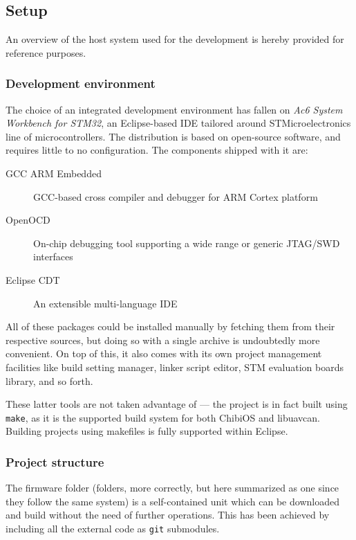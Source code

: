 \subsection{Setup}\label{subsec:sw_setup}
An overview of the host system used for the development is hereby provided for reference purposes.

\subsubsection{Development environment}
The choice of an integrated development environment has fallen on \emph{Ac6 System Workbench for STM32}, an Eclipse-based IDE tailored around STMicroelectronics line of microcontrollers.
The distribution is based on open-source software, and requires little to no configuration.
The components shipped with it are:
\begin{description}
    \item[GCC ARM Embedded] GCC-based cross compiler and debugger for ARM Cortex platform
    \item[OpenOCD] On-chip debugging tool supporting a wide range or generic JTAG/SWD interfaces
    \item[Eclipse CDT] An extensible multi-language IDE
\end{description}
All of these packages could be installed manually by fetching them from their respective sources, but doing so with a single archive is undoubtedly more convenient.
On top of this, it also comes with its own project management facilities like build setting manager, linker script editor, STM evaluation boards library, and so forth.

These latter tools are not taken advantage of --- the project is in fact built using \texttt{make}, as it is the supported build system for both ChibiOS and libuavcan.
Building projects using makefiles is fully supported within Eclipse.




\subsubsection{Project structure}
The firmware folder (folders, more correctly, but here summarized as one since they follow the same system) is a self-contained unit which can be downloaded and build without the need of further operations.
This has been achieved by including all the external code as \texttt{git} submodules.


